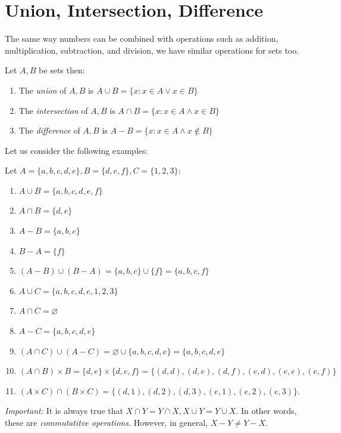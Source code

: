 \section{Union, Intersection, Difference}
The same way numbers can be combined with operations such as addition, multiplication, subtraction, and division, we have similar operations for sets too. 
\begin{defn}
    Let $A,B$ be sets then: 
    \begin{enumerate}
        \item The \emph{union} of $A,B$ is $A\cup B=\{ x:x\in A\lor x\in B \}$
        \item The \emph{intersection} of $A,B$ is $A\cap B=\{ x:x\in A\land x\in B \}$
        \item The \emph{difference} of $A,B$ is $A-B=\{ x:x\in A\land x\notin B \}$ 
    \end{enumerate}
\end{defn}

Let us consider the following examples: 
\begin{example}
    Let $A=\{ a,b,c,d,e \},B=\{ d,e,f \},C=\{ 1,2,3 \}$: 
    \begin{enumerate}
        \item $A\cup B=\{ a,b,c,d,e,f \}$
        \item $A\cap B=\{ d,e \}$
        \item $A-B=\{ a,b,c \}$
        \item $B-A=\{ f \}$
        \item $(A-B)\cup(B-A)=\{ a,b,c \}\cup\{ f \}=\{ a,b,c,f \}$
        \item $A\cup C=\{ a,b,c,d,e,1,2,3 \}$
        \item $A\cap C=\varnothing$
        \item $A-C=\{ a,b,c,d,e \}$
        \item $(A\cap C)\cup(A-C)=\varnothing \cup \{ a,b,c,d,e \}=\{ a,b,c,d,e \}$
        \item $(A\cap B)\times B=\{ d,e \}\times \{ d,e,f \}=\{ (d,d),(d,e),(d,f),(e,d),(e,e),(e,f) \}$
        \item $(A\times C)\cap(B\times C)=\{(d,1),(d,2),(d,3),(e,1),(e,2),(e,3)\}$.
    \end{enumerate}
\end{example}

\emph{Important:} It is always true that $X\cap Y=Y\cap X, X\cup Y=Y\cup X$. In other words, these are \emph{commutatitve operations.} However, in general, $X-Y\ne Y-X$.

